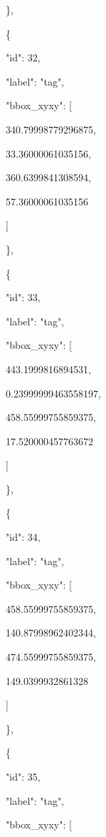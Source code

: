 \documentclass[10pt,a4paper]{article}
\begin{document}
    \},\allowbreak{}\par
    \{\par
      "id":\allowbreak{} 32,\allowbreak{}\par
      "label":\allowbreak{} "tag",\allowbreak{}\par
      "bbox\_xyxy":\allowbreak{} [\par
        340.79998779296875,\allowbreak{}\par
        33.36000061035156,\allowbreak{}\par
        360.6399841308594,\allowbreak{}\par
        57.36000061035156\par
      ]\par
    \},\allowbreak{}\par
    \{\par
      "id":\allowbreak{} 33,\allowbreak{}\par
      "label":\allowbreak{} "tag",\allowbreak{}\par
      "bbox\_xyxy":\allowbreak{} [\par
        443.1999816894531,\allowbreak{}\par
        0.23999999463558197,\allowbreak{}\par
        458.55999755859375,\allowbreak{}\par
        17.520000457763672\par
      ]\par
    \},\allowbreak{}\par
    \{\par
      "id":\allowbreak{} 34,\allowbreak{}\par
      "label":\allowbreak{} "tag",\allowbreak{}\par
      "bbox\_xyxy":\allowbreak{} [\par
        458.55999755859375,\allowbreak{}\par
        140.87998962402344,\allowbreak{}\par
        474.55999755859375,\allowbreak{}\par
        149.0399932861328\par
      ]\par
    \},\allowbreak{}\par
    \{\par
      "id":\allowbreak{} 35,\allowbreak{}\par
      "label":\allowbreak{} "tag",\allowbreak{}\par
      "bbox\_xyxy":\allowbreak{} [\par
\end{document}
